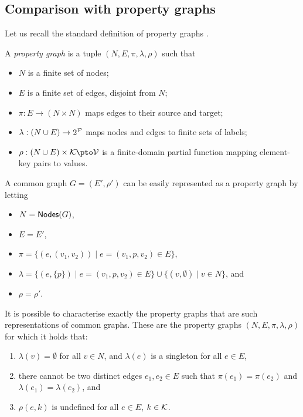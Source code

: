 \subsection{Comparison with property graphs}
\label{sect:PGCGComparison}

Let us recall the standard definition of property graphs \cite{ABDF23}. 

\begin{definition}
A \emph{property graph} is a tuple $(N, E, \pi, \lambda, \rho)$ such that 
\begin{itemize}
\item $N$ is a finite set of nodes;
\item $E$ is a finite set of edges, disjoint from $N$; 
\item $\pi : E \to (N \times N)$ maps edges to their source and target;
\item $\lambda : (N \cup E) \to 2^{\mathcal{P}}$ maps nodes and edges to finite sets of labels;
\item $\rho : (N \cup E)\times \Keys \pto \Values$ is a finite-domain partial function mapping element-key pairs to values.
\end{itemize}
\end{definition}

A common graph $G = (E', \rho')$ can be easily represented as a property graph by letting
\begin{itemize}
    \item $N = \mathsf{Nodes}(G)$,
    \item $E = E'$,
    \item $\pi = \{ (e, (v_1, v_2)) \mid e = (v_1, p, v_2) \in E \}$,
    \item $\lambda = \{ (e, \{ p \}) \mid e = (v_1, p, v_2) \in E \} \cup \{ (v, \emptyset) \mid v \in N \}$, and
    \item $\rho = \rho'$.
\end{itemize}

It is possible to characterise exactly the property graphs that are such representations of common graphs. These are the property graphs $(N, E, \pi, \lambda, \rho)$ for which it holds that:
\begin{enumerate}
    \item $\lambda(v) = \emptyset$ for all $v \in N$, and $\lambda(e)$ is a singleton for all $e \in E$,
    \item there cannot be two distinct edges $e_1, e_2 \in E$ such that $\pi(e_1) = \pi(e_2)$ and $\lambda(e_1) = \lambda(e_2)$, and
    \item $\rho(e, k)$ is undefined for all $e \in E$, $k \in \mathcal{K}$.
\end{enumerate}



